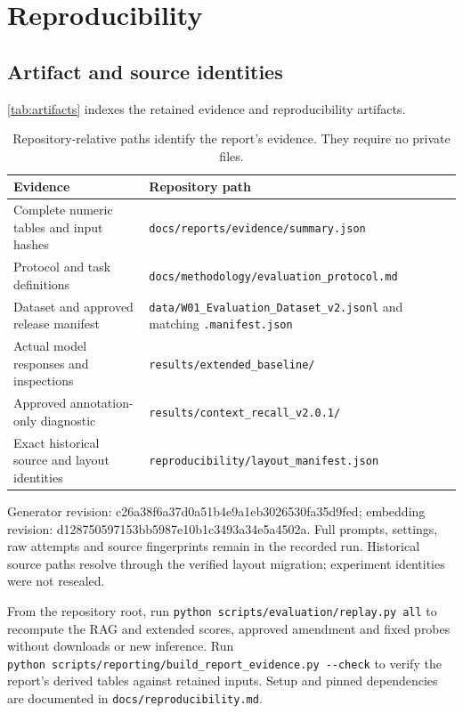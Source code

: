 \documentclass{amsart}
\theoremstyle{definition}
\numberwithin{equation}{section}
\begin{document}
\section{Reproducibility}\label{sec:reproducibility}
\subsection{Artifact and source identities}
\autoref{tab:artifacts} indexes the retained evidence and reproducibility artifacts.

\begin{table}[htbp]
\centering\small

\caption{Repository-relative paths identify the report's evidence. They require no private files.}
\label{tab:artifacts}
\begin{tabularx}{\linewidth}{@{}>{\raggedright\arraybackslash}p{.33\linewidth}X@{}}
\toprule
\textbf{Evidence} & \textbf{Repository path} \\
\midrule
Complete numeric tables and input hashes & \nolinkurl{docs/reports/evidence/summary.json} \\
Protocol and task definitions & \nolinkurl{docs/methodology/evaluation_protocol.md} \\
Dataset and approved release manifest & \nolinkurl{data/W01_Evaluation_Dataset_v2.jsonl} and matching \nolinkurl{.manifest.json} \\
Actual model responses and inspections & \nolinkurl{results/extended_baseline/} \\
Approved annotation-only diagnostic & \nolinkurl{results/context_recall_v2.0.1/} \\
Exact historical source and layout identities & \nolinkurl{reproducibility/layout_manifest.json} \\
\bottomrule
\end{tabularx}
\end{table}
Generator revision: \mbox{c26a38f6}\allowbreak\mbox{a37d0a51}\allowbreak\mbox{b4e9a1eb}\allowbreak\mbox{3026530f}\allowbreak\mbox{a35d9fed}; embedding revision: \mbox{d1287505}\allowbreak\mbox{97153bb5}\allowbreak\mbox{987e10b1}\allowbreak\mbox{c3493a34}\allowbreak\mbox{e5a4502a}. Full prompts, settings, raw attempts and source fingerprints remain in the recorded run. Historical source paths resolve through the verified layout migration; experiment identities were not resealed.

From the repository root, run \nolinkurl{python}\ \nolinkurl{scripts/evaluation/replay.py}\ \nolinkurl{all} to recompute the RAG and extended scores, approved amendment and fixed probes without downloads or new inference. Run \nolinkurl{python}\ \nolinkurl{scripts/reporting/build_report_evidence.py}\ \nolinkurl{--check} to verify the report's derived tables against retained inputs. Setup and pinned dependencies are documented in \nolinkurl{docs/reproducibility.md}.
\end{document}
